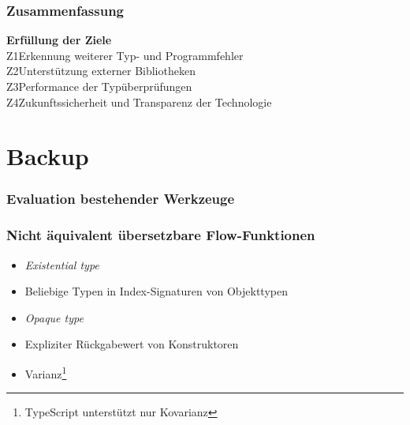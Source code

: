     \begin{frame}
      \frametitle{Zusammenfassung}
      \textbf{Erfüllung der Ziele}\\[1em]
      Z1\hspace{0.75em}Erkennung weiterer Typ- und Programmfehler\\[.6em]
      Z2\hspace{0.75em}Unterstützung externer Bibliotheken\\[.6em]
      Z3\hspace{0.75em}Performance der Typüberprüfungen\\[.6em]
      Z4\hspace{0.75em}Zukunftssicherheit und Transparenz der Technologie
    \end{frame}

  \appendix
    \begin{frame}
    \end{frame}

  \section{Backup}

    \begin{frame}[noframenumbering]
      \frametitle{Evaluation bestehender Werkzeuge}
      
    \end{frame}

    \begin{frame}
      \frametitle{Nicht äquivalent übersetzbare Flow-Funktionen}
      \begin{itemize}
        \item \textit{Existential type}
        \item Beliebige Typen in Index-Signaturen von Objekttypen
        \item \textit{Opaque type}
        \item Expliziter Rückgabewert von Konstruktoren
        \item Varianz\footnote{TypeScript unterstützt nur Kovarianz}
      \end{itemize}
    \end{frame}

